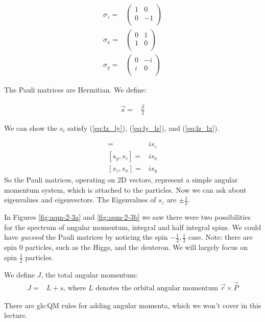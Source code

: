 \documentclass[]{article}
\begin{document}
\begin{align*}
	\sigma_z =& \begin{pmatrix}
		1 & 0 \\
		0 & -1\\
	\end{pmatrix} \\
	\sigma_x =& \begin{pmatrix}
		0 & 1 \\
		1 & 0\\
	\end{pmatrix}\\
	\sigma_y =& \begin{pmatrix}
		0 & -i \\
		i & 0\\
	\end{pmatrix}
\end{align*}

The Pauli matrices are Hermitian. We define:

\begin{align*}
	\vec{s} =& \frac{\vec{\sigma}}{2} 
\end{align*}

We can show the $s_i$ satisfy (\ref{eq:lx_ly}), (\ref{eq:ly_lz}), and (\ref{eq:lz_lx}).

\begin{align*}
	[s_x,s_y] =& i s_z \\
	[s_y,s_z] =& i s_x\\
	[s_z,s_x] =& i s_y
\end{align*}
So the Pauli matrices, operating on 2D vectors, represent a simple angular momentum system, which is attached to the particles. Now we can ask about eigenvalues and eigenvectors. The Eigenvalues of $s_z$ are $\pm \frac{1}{2}$. 

In Figures \ref{fig:aqm-2-3a} and \ref{fig:aqm-2-3b} we saw there were two possibilities for the spectrum of angular momentum, integral and half integral spins. We could have \emph{guessed} the Pauli matrices by noticing the spin ${-\frac{1}{2},\frac{1}{2}}$ case. Note: there are spin $0$ particles, such as the Higgs, and the deuteron. We will largely focus on spin $\frac{1}{2}$ particles.

We define $J$, the total angular momentum:
\begin{align*}
	J=&L+s \text{, where $L$ denotes the orbital angular momentum $\vec{r}\times\vec{P}$}
\end{align*}

There are \gls{gls:QM} rules for adding angular momenta, which we won't cover in this lecture.
\end{document}
